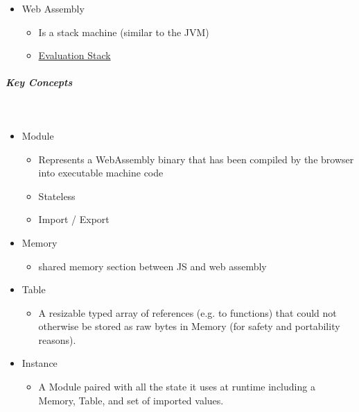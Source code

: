 \documentclass[11pt,twoside,landscape]{article}
\begin{document}
\begin{multicols}{4}
\begin{itemize}
\item Web Assembly
\begin{itemize}
\item Is a stack machine (similar to the JVM)
\item \href{../../../roam/20221230171752-what_is_a_evaluation_stack.org}{Evaluation Stack}
\end{itemize}
\end{itemize}
\subparagraph{Key Concepts} \
\label{sec:org8104022}
\begin{itemize}
\item Module
\begin{itemize}
\item Represents a WebAssembly binary that has been compiled by the browser into executable machine code
\item Stateless
\item Import / Export
\end{itemize}
\item Memory
\begin{itemize}
\item shared memory section between JS and web assembly
\end{itemize}
\item Table
\begin{itemize}
\item A resizable typed array of references (e.g. to functions) that could not otherwise be stored as raw bytes in Memory (for safety and portability reasons).
\end{itemize}
\item Instance
\begin{itemize}
\item A Module paired with all the state it uses at runtime including a Memory, Table, and set of imported values.
\end{itemize}
\end{itemize}


\end{multicols}
\end{document}
